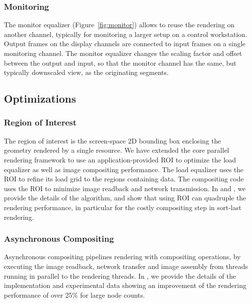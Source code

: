 \documentclass[10pt,journal,compsoc]{IEEEtran}
\newcommand{\fig}[1]{Figure~\ref{#1}}
\begin{document}
\subsubsection{Monitoring}

The monitor equalizer (\fig{fig:monitor}) allows to reuse the rendering on
another channel, typically for monitoring a larger setup on a control
workstation. Output frames on the display channels are connected to input frames
on a single monitoring channel. The monitor equalizer changes the scaling factor
and offset between the output and input, so that the monitor channel has the
same, but typically downscaled view, as the originating segments.

\subsection{Optimizations}

\subsubsection{Region of Interest}

The region of interest is the screen-space 2D bounding box enclosing the
geometry rendered by a single resource. We have extended the core parallel
rendering framework to use an application-provided ROI to optimize the load
equalizer as well as image compositing performance. The load equalizer uses the
ROI to refine its load grid to the regions containing data. The compositing code
uses the ROI to minimize image readback and network transmission. In
\cite{MEP:10} and \cite{EBAHMP:12}, we provide the details of the algorithm, and
show that using ROI can quadruple the rendering performance, in particular for
the costly compositing step in sort-last rendering.

\subsubsection{Asynchronous Compositing}

Asynchronous compositing pipelines rendering with compositing operations, by
executing the image readback, network transfer and image assembly from threads
running in parallel to the rendering threads. In \cite{EBAHMP:12}, we provide
the details of the implementation and experimental data showing an improvement
of the rendering performance of over 25\% for large node counts.
\end{document}
